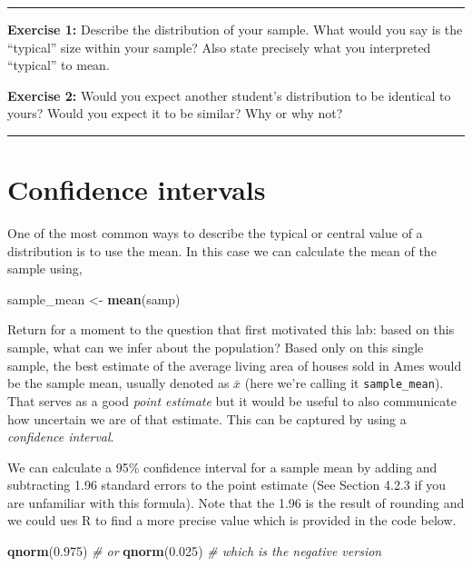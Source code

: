 \documentclass[]{book}
\newenvironment{Shaded}{\begin{snugshade}}{\end{snugshade}}
\newcommand{\CommentTok}[1]{\textcolor[rgb]{0.56,0.35,0.01}{\textit{#1}}}
\newcommand{\FloatTok}[1]{\textcolor[rgb]{0.00,0.00,0.81}{#1}}
\newcommand{\KeywordTok}[1]{\textcolor[rgb]{0.13,0.29,0.53}{\textbf{#1}}}
\newcommand{\NormalTok}[1]{#1}
\newcommand{\StringTok}[1]{\textcolor[rgb]{0.31,0.60,0.02}{#1}}
\theoremstyle{definition}
\theoremstyle{definition}
\theoremstyle{definition}
\theoremstyle{remark}
\begin{document}
\begin{center}\rule{0.5\linewidth}{\linethickness}\end{center}

\textbf{Exercise 1:} Describe the distribution of your sample. What
would you say is the ``typical'' size within your sample? Also state
precisely what you interpreted ``typical'' to mean.

\textbf{Exercise 2:} Would you expect another student's distribution to
be identical to yours? Would you expect it to be similar? Why or why
not?

\begin{center}\rule{0.5\linewidth}{\linethickness}\end{center}

\hypertarget{confidence-intervals}{%
\section{Confidence intervals}\label{confidence-intervals}}

One of the most common ways to describe the typical or central value of
a distribution is to use the mean. In this case we can calculate the
mean of the sample using,

\begin{Shaded}
\begin{Highlighting}[]
\NormalTok{sample_mean <-}\StringTok{ }\KeywordTok{mean}\NormalTok{(samp)}
\end{Highlighting}
\end{Shaded}

Return for a moment to the question that first motivated this lab: based
on this sample, what can we infer about the population? Based only on
this single sample, the best estimate of the average living area of
houses sold in Ames would be the sample mean, usually denoted as
\(\bar{x}\) (here we're calling it \texttt{sample\_mean}). That serves
as a good \emph{point estimate} but it would be useful to also
communicate how uncertain we are of that estimate. This can be captured
by using a \emph{confidence interval}.

We can calculate a 95\% confidence interval for a sample mean by adding
and subtracting 1.96 standard errors to the point estimate (See Section
4.2.3 if you are unfamiliar with this formula). Note that the 1.96 is
the result of rounding and we could ues R to find a more precise value
which is provided in the code below.

\begin{Shaded}
\begin{Highlighting}[]
\KeywordTok{qnorm}\NormalTok{(}\FloatTok{0.975}\NormalTok{) }\CommentTok{# or}
\KeywordTok{qnorm}\NormalTok{(}\FloatTok{0.025}\NormalTok{) }\CommentTok{# which is the negative version}
\end{Highlighting}
\end{Shaded}
\end{document}
